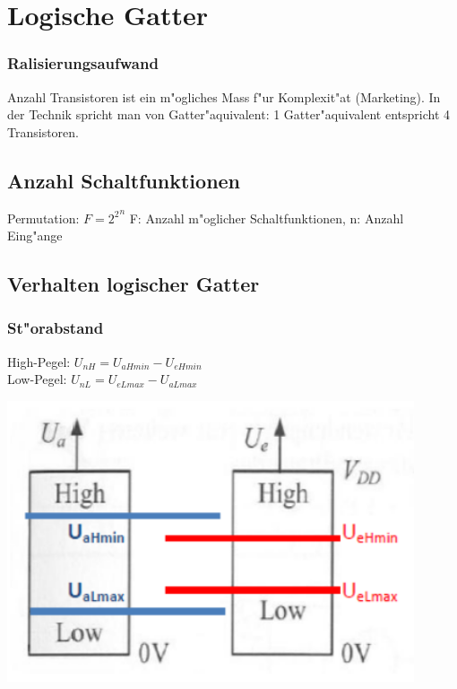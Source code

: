 \section{Logische Gatter}

\subsubsection{Ralisierungsaufwand}
Anzahl Transistoren ist ein m"ogliches Mass f"ur Komplexit"at (Marketing). In der Technik spricht man von Gatter"aquivalent: 1 Gatter"aquivalent entspricht 4 Transistoren.

\subsection{Anzahl Schaltfunktionen}
Permutation: $F= {2^2}^n$ F: Anzahl m"oglicher Schaltfunktionen, n: Anzahl Eing"ange

\subsection{Verhalten logischer Gatter}
	\begin{minipage}[c]{7 cm}
		\subsubsection{St"orabstand}
			High-Pegel: $ U_{nH} = U_{aHmin} - U_{eHmin} $\\
			Low-Pegel: $ U_{nL} = U_{eLmax} - U_{aLmax} $\\	
			\newline
			\newline
			\newline			
	\end{minipage}	
	\begin{minipage}[c]{6 cm}
		\includegraphics[width=0.9\textwidth]{pics/Pegelbereiche_Stoerabstand}
	\end{minipage}

